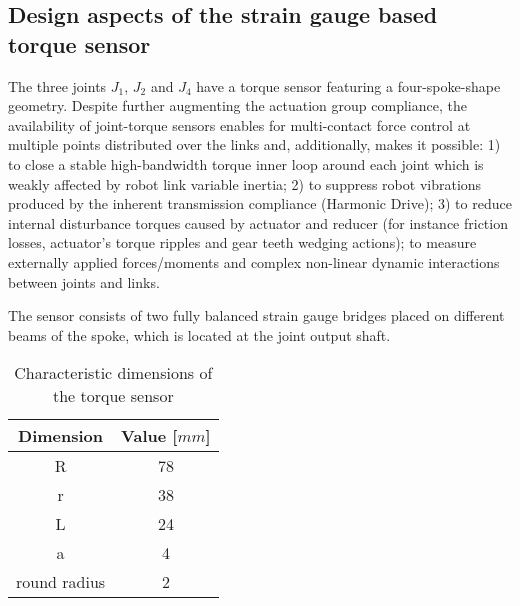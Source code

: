 \subsection{Design aspects of the strain gauge based torque sensor}
\label{subsec:DesignTorqueSensor}
The three joints $J_1$, $J_2$ and $J_4$ have a torque sensor featuring a four-spoke-shape geometry. 
Despite further augmenting the actuation group compliance, the availability of joint-torque sensors enables for multi-contact force control at multiple points distributed over the links and, additionally, makes it possible: 1) to close a stable high-bandwidth torque inner loop around each joint which is weakly affected by robot link variable inertia; 2) to suppress robot vibrations produced by the inherent transmission compliance (Harmonic Drive); 3) to reduce internal disturbance torques caused by actuator and reducer (for instance friction losses, actuator's torque ripples and gear teeth wedging actions); to measure externally applied forces/moments and complex non-linear dynamic interactions between joints and links.
\par The sensor consists of two fully balanced strain gauge bridges placed on different beams of the spoke, which is located at the joint output shaft. 
%
%
\begin{table}[t]
	\renewcommand{\arraystretch}{1.3}
	\caption{Characteristic dimensions of the torque sensor}
	\label{tab:sensorDimension}
	\centering
	\begin{tabular}{c c}
		\hline \hline
		\bfseries Dimension & \bfseries Value [$mm$] \\
		\hline
		R & 78 \\
		r & 38 \\
		L & 24 \\
		a & 4 \\
		round radius & 2 \\
		\hline \hline
	\end{tabular}
\end{table} 
%
\DIFdelbegin %
{%
}
\DIFdelend %
